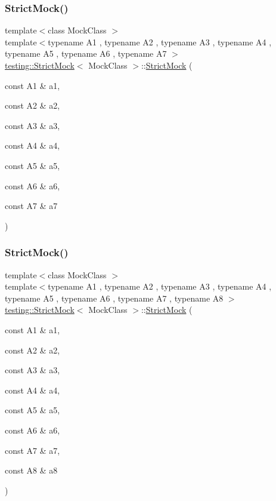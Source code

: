 \subsubsection{\texorpdfstring{StrictMock()}{StrictMock()}\hspace{0.1cm}{\footnotesize\ttfamily [8/11]}}
{\footnotesize\ttfamily template$<$class Mock\+Class $>$ \\
template$<$typename A1 , typename A2 , typename A3 , typename A4 , typename A5 , typename A6 , typename A7 $>$ \\
\mbox{\hyperlink{classtesting_1_1StrictMock}{testing\+::\+Strict\+Mock}}$<$ Mock\+Class $>$\+::\mbox{\hyperlink{classtesting_1_1StrictMock}{Strict\+Mock}} (\begin{DoxyParamCaption}\item[{const A1 \&}]{a1,  }\item[{const A2 \&}]{a2,  }\item[{const A3 \&}]{a3,  }\item[{const A4 \&}]{a4,  }\item[{const A5 \&}]{a5,  }\item[{const A6 \&}]{a6,  }\item[{const A7 \&}]{a7 }\end{DoxyParamCaption})\hspace{0.3cm}{\ttfamily [inline]}}

\mbox{\label{classtesting_1_1StrictMock_aac6eaaad3e94491ada7bb43ee6149775}} 
\subsubsection{\texorpdfstring{StrictMock()}{StrictMock()}\hspace{0.1cm}{\footnotesize\ttfamily [9/11]}}
{\footnotesize\ttfamily template$<$class Mock\+Class $>$ \\
template$<$typename A1 , typename A2 , typename A3 , typename A4 , typename A5 , typename A6 , typename A7 , typename A8 $>$ \\
\mbox{\hyperlink{classtesting_1_1StrictMock}{testing\+::\+Strict\+Mock}}$<$ Mock\+Class $>$\+::\mbox{\hyperlink{classtesting_1_1StrictMock}{Strict\+Mock}} (\begin{DoxyParamCaption}\item[{const A1 \&}]{a1,  }\item[{const A2 \&}]{a2,  }\item[{const A3 \&}]{a3,  }\item[{const A4 \&}]{a4,  }\item[{const A5 \&}]{a5,  }\item[{const A6 \&}]{a6,  }\item[{const A7 \&}]{a7,  }\item[{const A8 \&}]{a8 }\end{DoxyParamCaption})\hspace{0.3cm}{\ttfamily [inline]}}


